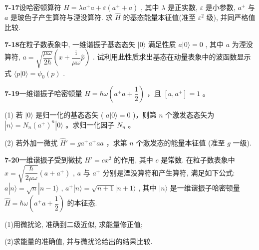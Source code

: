 \vfill

\newpage

\textbf{7-17}\quad 设哈密顿算符 $\displaystyle \hat{H} = \lambda a^{+}a + \varepsilon (a^{+} + a)$ , 其中 $\displaystyle \lambda$ 是正实数, $\displaystyle \varepsilon$ 是小参数, $\displaystyle a^{+}$ 与 $\displaystyle a$ 是玻色子产生算符与湮没算符. 求 $\displaystyle \hat{H}$ 的基态能量本征值(准至 $\displaystyle \varepsilon^2$ 级), 并同严格值比较.

\vfill

\newpage

\textbf{7-18}\quad 在粒子数表象中, 一维谐振子基态态矢 $\displaystyle |0\rangle$ 满足性质 $\displaystyle a|0\rangle = 0$ , 其中 $\displaystyle a$ 为湮没算符, $\displaystyle a = \sqrt{\dfrac{\mu\omega}{2\hbar}}\left(x + \dfrac{\mathrm{i}}{\mu\omega}\hat{p}\right)$ . 试利用此性质求出基态在动量表象中的波函数显示式 $\displaystyle \langle p|0\rangle = \psi_0(p)$ .

\vfill

\newpage

\textbf{7-19}\quad 一维谐振子哈密顿量 $\displaystyle \hat{H} = \hbar \omega\left(a^{+}a + \dfrac{1}{2}\right)$ ，且 $\displaystyle [a, a^{+}] = 1$ 。

(1) 若 $\displaystyle |0\rangle$ 是归一化的基态态矢 ( $\displaystyle a|0\rangle = 0$ )，则第 $\displaystyle n$ 个激发态态矢为 $\displaystyle |n\rangle = N_{n}(a^{+})^{n}|0\rangle$ 。求归一化因子 $\displaystyle N_{n}$ 。

(2) 若外加一微扰 $\displaystyle \hat{H}' = ga^{+}a^{+}aa$ ，求第 $\displaystyle n$ 个激发态的能量本征值 (准至 $\displaystyle g$ 一级).

\vfill

\newpage

\textbf{7-20}\quad 一维谐振子受到微扰 $\displaystyle \hat{H}' = cx^2$ 的作用, 其中 $\displaystyle c$ 是常数. 在粒子数表象中 $\displaystyle x = \sqrt{\dfrac{\hbar}{2\mu\omega}} (a + a^{+})$ , $\displaystyle a$ 与 $\displaystyle a^{+}$ 分别是湮没算符和产生算符, 满足如下公式: $\displaystyle a|n\rangle = \sqrt{n}|n - 1\rangle$ , $\displaystyle a^{+}|n\rangle = \sqrt{n + 1}|n + 1\rangle$ , 其中 $\displaystyle |n\rangle$ 是一维谐振子哈密顿量 $\displaystyle \hat{H} = \hbar\omega\left(a^{+}a + \dfrac{1}{2}\right)$ 的本征态.

(1)用微扰论, 准确到二级近似, 求能量修正值;

(2)求能量的准确值, 并与微扰论给出的结果比较.

\vfill

\newpage

